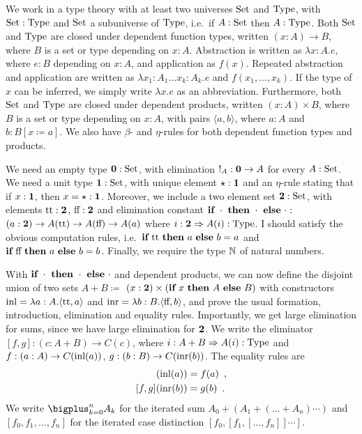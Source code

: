 \documentclass{article}
\begin{document}
We work in a type theory with at least two universes $\text{Set}$ and
$\text{Type}$, with $\text{Set} : \text{Type}$ and $\text{Set}$ a subuniverse of $\text{Type}$,
i.e.\ if $A : \text{Set}$ then $A : \text{Type}$. Both $\text{Set}$ and $\text{Type}$ are
closed under dependent function types, written $(x : A) \to B$, where
$B$ is a set or type depending on $x: A$. Abstraction is written as
$\lambda x : A . e$, where $e : B$ depending on $x : A$, and
application as $f(x)$. Repeated abstraction and application are
written as $\lambda x_1 : A_1 \ldots x_k : A_k . e$ and $f(x_1,
\ldots, x_k)$. If the type of $x$ can be inferred, we simply write
$\lambda x.e$ as an abbreviation.  Furthermore, both $\text{Set}$ and
$\text{Type}$ are closed under dependent products, written $(x : A) \times
B$, where $B$ is a set or type depending on $x: A$, with pairs
$\langle a , b \rangle$, where $a : A$ and $b : B[x \coloneqq a]$.
We also have $\beta$- and $\eta$-rules for both dependent function types
and products.

We need an empty type $\mathbf{0} : \text{Set}$, with elimination ${!_A : \mathbf{0}
  \to A}$ for every $A : \text{Set}$. We need a unit type $\mathbf{1} : \text{Set}$,
with unique element $\star : \mathbf{1}$ and an $\eta$-rule stating that
if $x : \mathbf{1}$, then $x = \star : \mathbf{1}$. Moreover, we include a two
element set $\mathbf{2} : \text{Set}$, with elements $\text{tt} : \mathbf{2}$, $\text{ff} :
\mathbf{2}$ and elimination constant $\textbf{if}~\cdot~\textbf{then}~\cdot~\textbf{else}~\cdot :$
$(a : \mathbf{2}) \to A(\text{tt}) \to A(\text{ff}) \to A(a)$ where $i : \mathbf{2}
\Rightarrow A(i) : \text{Type}$. I should satisfy the obvious computation
rules, i.e.\ $\textbf{if}~\text{tt}~\textbf{then}~a~\textbf{else}~b = a$ and
$\textbf{if}~\text{ff}~\textbf{then}~a~\textbf{else}~b = b$. Finally, we require the type $\mathbb{N}$
of natural numbers.

With $\textbf{if}~\cdot~\textbf{then}~\cdot~\textbf{else}~\cdot$ and dependent products, we can now
define the disjoint union of two sets $A + B \coloneqq$ ${(x : \mathbf{2})}
\times (\textbf{if}~x~\textbf{then}~A~\textbf{else}~B)$ with constructors $\text{inl} = \lambda {a :
  A} . \langle \text{tt} , a \rangle$ and $\text{inr} = \lambda {b : B}
. \langle \text{ff} , b \rangle$, and prove the usual formation,
introduction, elimination and equality rules. Importantly, we get
large elimination for sums, since we have large elimination for
$\mathbf{2}$. We write the eliminator $[f, g] : {(c : A + B)} \to C(c)$, where
$i : A + B \Rightarrow A(i) : \text{Type}$ and $f : (a : A) \to C(\text{inl}(a))$,
$g : (b : B) \to C(\text{inr}(b))$. The equality rules are
\begin{align*}
[f, g](\inl(a)) &= f(a) \enspace , \\
[f, g](\inr(b)) &= g(b) \enspace .
\end{align*}
We write $\bigplus_{k = 0}^n A_k$ for the iterated sum $A_0 + (A_1 +
(\ldots + A_n)\cdots)$ and $[f_0, f_1, \ldots, f_n]$ for the iterated
case distinction $[f_0, [f_1, [\ldots , f_n]]\cdots]$.
\end{document}
